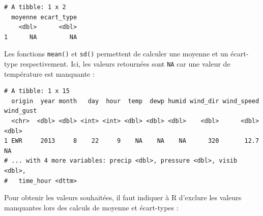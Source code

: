 \documentclass[a4paperpaper,]{article}
\newenvironment{Shaded}{\begin{snugshade}}{\end{snugshade}}
\newcommand{\DataTypeTok}[1]{\textcolor[rgb]{0.00,0.34,0.68}{#1}}
\newcommand{\KeywordTok}[1]{\textcolor[rgb]{0.12,0.11,0.11}{\textbf{#1}}}
\newcommand{\NormalTok}[1]{\textcolor[rgb]{0.12,0.11,0.11}{#1}}
\newcommand{\OperatorTok}[1]{\textcolor[rgb]{0.12,0.11,0.11}{#1}}
\newcommand{\OtherTok}[1]{\textcolor[rgb]{0.00,0.43,0.16}{#1}}
\newcommand{\StringTok}[1]{\textcolor[rgb]{0.75,0.01,0.01}{#1}}
\theoremstyle{definition}
\theoremstyle{definition}
\theoremstyle{definition}
\theoremstyle{remark}
\begin{document}
\begin{Shaded}
\end{Shaded}

\begin{verbatim}
# A tibble: 1 x 2
  moyenne ecart_type
    <dbl>      <dbl>
1      NA         NA
\end{verbatim}

Les fonctions \texttt{mean()} et \texttt{sd()} permettent de calculer
une moyenne et un écart-type respectivement. Ici, les valeurs retournées
sont \texttt{NA} car une valeur de température est manquante :

\begin{Shaded}
\end{Shaded}

\begin{verbatim}
# A tibble: 1 x 15
  origin  year month   day  hour  temp  dewp humid wind_dir wind_speed wind_gust
  <chr>  <dbl> <dbl> <int> <int> <dbl> <dbl> <dbl>    <dbl>      <dbl>     <dbl>
1 EWR     2013     8    22     9    NA    NA    NA      320       12.7        NA
# ... with 4 more variables: precip <dbl>, pressure <dbl>, visib <dbl>,
#   time_hour <dttm>
\end{verbatim}

Pour obtenir les valeurs souhaitées, il faut indiquer à R d'exclure les
valeurs manquantes lors des calculs de moyenne et écart-types :

\begin{Shaded}
\end{Shaded}
\end{document}
